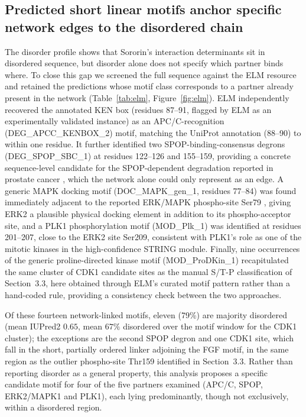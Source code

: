 \documentclass[11pt]{article}
\begin{document}
\subsection{Predicted short linear motifs anchor specific network edges to the disordered chain}
The disorder profile shows that Sororin's interaction determinants sit in disordered sequence, but disorder alone does not specify which partner binds where. To close this gap we screened the full sequence against the ELM resource and retained the predictions whose motif class corresponds to a partner already present in the network (Table~\ref{tab:elm}, Figure~\ref{fig:elm}). ELM independently recovered the annotated KEN box (residues 87--91, flagged by ELM as an experimentally validated instance) as an APC/C-recognition (DEG\_APCC\_KENBOX\_2) motif, matching the UniProt annotation (88--90) to within one residue. It further identified two SPOP-binding-consensus degrons (DEG\_SPOP\_SBC\_1) at residues 122--126 and 155--159, providing a concrete sequence-level candidate for the SPOP-dependent degradation reported in prostate cancer \citep{zhang2021}, which the network alone could only represent as an edge. A generic MAPK docking motif (DOC\_MAPK\_gen\_1, residues 77--84) was found immediately adjacent to the reported ERK/MAPK phospho-site Ser79 \citep{nguyen2010}, giving ERK2 a plausible physical docking element in addition to its phospho-acceptor site, and a PLK1 phosphorylation motif (MOD\_Plk\_1) was identified at residues 201--207, close to the ERK2 site Ser209, consistent with PLK1's role as one of the mitotic kinases in the high-confidence STRING module. Finally, nine occurrences of the generic proline-directed kinase motif (MOD\_ProDKin\_1) recapitulated the same cluster of CDK1 candidate sites as the manual S/T-P classification of Section~3.3, here obtained through ELM's curated motif pattern rather than a hand-coded rule, providing a consistency check between the two approaches.

Of these fourteen network-linked motifs, eleven (79\%) are majority disordered (mean IUPred2 $0.65$, mean $67\%$ disordered over the motif window for the CDK1 cluster); the exceptions are the second SPOP degron and one CDK1 site, which fall in the short, partially ordered linker adjoining the FGF motif, in the same region as the outlier phospho-site Thr159 identified in Section~3.3. Rather than reporting disorder as a general property, this analysis proposes a specific candidate motif for four of the five partners examined (APC/C, SPOP, ERK2/MAPK1 and PLK1), each lying predominantly, though not exclusively, within a disordered region.
\end{document}
